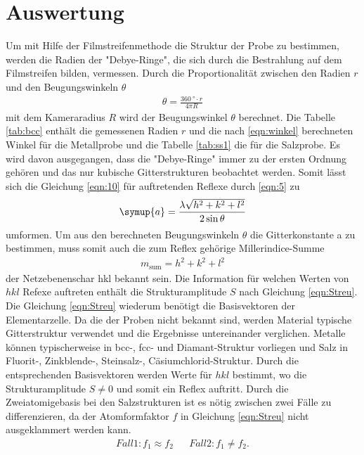 \section{Auswertung}
\label{sec:Auswertung}

Um mit Hilfe der Filmstreifenmethode die Struktur der Probe zu bestimmen, werden
die Radien der "Debye-Ringe", die sich durch die Bestrahlung auf dem Filmstreifen bilden,
vermessen. Durch die Proportionalität zwischen den Radien $r$ und den Beugungswinkeln $\theta$
\begin{align}
\theta=\frac{\SI{360}{\degree}\cdot r}{4 \pi R } \label{eqn:winkel}
\end{align}
mit dem Kameraradius $R$ wird der Beugungswinkel $\theta$ berechnet.
Die Tabelle \ref{tab:bcc} enthält die gemessenen Radien $r$
und die nach \ref{eqn:winkel} berechneten Winkel
für die Metallprobe und die Tabelle \ref{tab:ss1} die für die Salzprobe.
Es wird davon ausgegangen, dass die "Debye-Ringe" immer zu der ersten Ordnung gehören
und das nur kubische Gitterstrukturen beobachtet werden.
Somit lässt sich die Gleichung \ref{eqn:10} für auftretenden
Reflexe durch \eqref{eqn:5} zu
\begin{align}
\symup{a} = \frac{\lambda \sqrt{h^2 +k^2+l^2}}{2\sin{\theta}} \label{eqn:Gitterkonst}
\end{align}
umformen.
Um aus den berechneten Beugungswinkeln $\theta$ die Gitterkonstante a
zu bestimmen, muss somit auch die zum Reflex gehörige Millerindice-Summe
\begin{align*}
  m_\mathrm{sum}=h^{2} + k^{2} + l^{2}
\end{align*}
der Netzebenenschar hkl bekannt sein.
Die Information für welchen Werten von $hkl$ Refexe auftreten
enthält die Strukturamplitude $S$ nach Gleichung \eqref{eqn:Streu}.
Die Gleichung \eqref{eqn:Streu} wiederum benötigt die Basisvektoren
der Elementarzelle. Da die der Proben nicht bekannt sind, werden
Material typische Gitterstruktur verwendet und die Ergebnisse
untereinander verglichen. Metalle können typischerweise in
 bcc-, fcc- und Diamant-Struktur
vorliegen und Salz in Fluorit-, Zinkblende-,
Steinsalz-, Cäsiumchlorid-Struktur.
Durch die entsprechenden Basisvektoren
werden Werte für $hkl$ bestimmt, wo die Strukturamplitude
$S\neq0$ und somit ein Reflex auftritt.
Durch die Zweiatomigebasis bei den
Salzstrukturen ist es nötig zwischen zwei Fälle zu differenzieren,
da der Atomformfaktor $f$ in Gleichung
\eqref{eqn:Streu} nicht ausgeklammert werden kann.
\begin{align*}
  Fall 1: f_1\approx f_2  & & Fall 2: f_1\neq f_2.
\end{align*}
